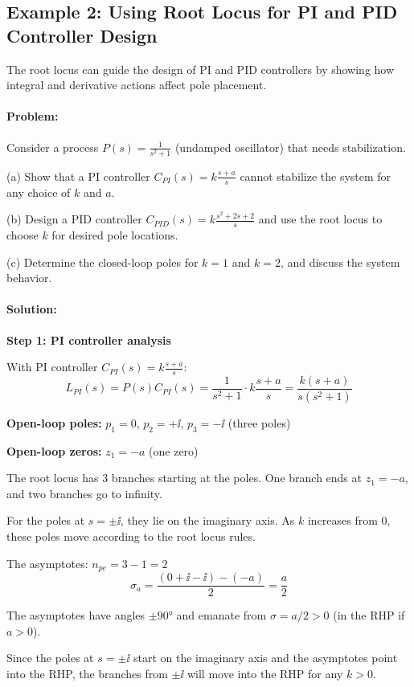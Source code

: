 \documentclass[11pt,a4paper]{article}
\begin{document}
\subsection{Example 2: Using Root Locus for PI and PID Controller Design}

The root locus can guide the design of PI and PID controllers by showing how integral and derivative actions affect pole placement.

\paragraph{Problem:}
Consider a process $P(s) = \frac{1}{s^2 + 1}$ (undamped oscillator) that needs stabilization.

(a) Show that a PI controller $C_{PI}(s) = k\frac{s+a}{s}$ cannot stabilize the system for any choice of $k$ and $a$.

(b) Design a PID controller $C_{PID}(s) = k\frac{s^2 + 2s + 2}{s}$ and use the root locus to choose $k$ for desired pole locations.

(c) Determine the closed-loop poles for $k = 1$ and $k = 2$, and discuss the system behavior.

\paragraph{Solution:}

\textbf{Step 1: PI controller analysis}

With PI controller $C_{PI}(s) = k\frac{s+a}{s}$:
\[
L_{PI}(s) = P(s)C_{PI}(s) = \frac{1}{s^2 + 1} \cdot k\frac{s+a}{s} = \frac{k(s+a)}{s(s^2+1)}
\]

\textbf{Open-loop poles:} $p_1 = 0$, $p_2 = +\ii$, $p_3 = -\ii$ (three poles)

\textbf{Open-loop zeros:} $z_1 = -a$ (one zero)

The root locus has 3 branches starting at the poles. One branch ends at $z_1 = -a$, and two branches go to infinity.

For the poles at $s = \pm \ii$, they lie on the imaginary axis. As $k$ increases from 0, these poles move according to the root locus rules.

The asymptotes: $n_{pe} = 3 - 1 = 2$
\[
\sigma_a = \frac{(0 + \ii - \ii) - (-a)}{2} = \frac{a}{2}
\]

The asymptotes have angles $\pm 90°$ and emanate from $\sigma = a/2 > 0$ (in the RHP if $a > 0$).

Since the poles at $s = \pm \ii$ start on the imaginary axis and the asymptotes point into the RHP, the branches from $\pm \ii$ will move into the RHP for any $k > 0$.
\end{document}
